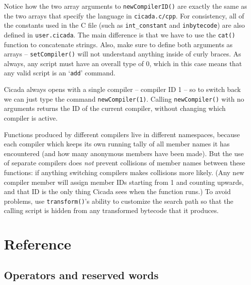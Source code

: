 \documentclass{article}
\begin{document}
\noindent Notice how the two array arguments to \verb#newCompilerID()# are exactly the same as the two arrays that specify the language in \verb#cicada.c/cpp#.  For consistency, all of the constants used in the C file (such as \verb#int_constant# and \verb#inbytecode#) are also defined in \verb#user.cicada#.  The main difference is that we have to use the \verb#cat()# function to concatenate strings.  Also, make sure to define both arguments as arrays -- \verb#setCompiler()# will not understand anything inside of curly braces.  As always, any script must have an overall type of 0, which in this case means that any valid script is an `\verb#add#' command.

Cicada always opens with a single compiler -- compiler ID 1 -- so to switch back we can just type the command \verb#newCompiler(1)#.  Calling \verb#newCompiler()# with no arguments returns the ID of the current compiler, without changing which compiler is active.

Functions produced by different compilers live in different namespaces, because each compiler which keeps its own running tally of all member names it has encountered (and how many anonymous members have been made).  But the use of separate compilers does \emph{not} prevent collisions of member names between these functions:  if anything switching compilers makes collisions more likely.  (Any new compiler member will assign member IDs starting from 1 and counting upwards, and that ID is the only thing Cicada sees when the function runs.)  To avoid problems, use \verb#transform()#'s ability to customize the search path so that the calling script is hidden from any transformed bytecode that it produces.


\newpage



\section{Reference}




\subsection{Operators and reserved words}   

\small
\end{document}
